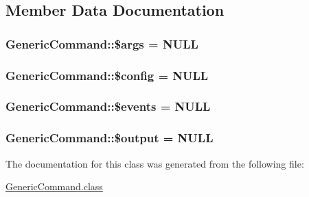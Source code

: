 \subsection{Member Data Documentation}
\hypertarget{classGenericCommand_aaba87ed8dbcb64903cc986bce80905d2}{
\subsubsection[{\$args}]{\setlength{\rightskip}{0pt plus 5cm}Generic\-Command\-::\$args = N\-U\-L\-L\hspace{0.3cm}{\ttfamily [private]}}}\label{classGenericCommand_aaba87ed8dbcb64903cc986bce80905d2}
\hypertarget{classGenericCommand_aa44f85a0df16aec7516d7e2dd97cb5e0}{
\subsubsection[{\$config}]{\setlength{\rightskip}{0pt plus 5cm}Generic\-Command\-::\$config = N\-U\-L\-L\hspace{0.3cm}{\ttfamily [private]}}}\label{classGenericCommand_aa44f85a0df16aec7516d7e2dd97cb5e0}
\hypertarget{classGenericCommand_a88fc89058cfe1af1d211bf82c59deee0}{
\subsubsection[{\$events}]{\setlength{\rightskip}{0pt plus 5cm}Generic\-Command\-::\$events = N\-U\-L\-L\hspace{0.3cm}{\ttfamily [private]}}}\label{classGenericCommand_a88fc89058cfe1af1d211bf82c59deee0}
\hypertarget{classGenericCommand_a8f106d346e007dea8c5bbc421c0a504a}{
\subsubsection[{\$output}]{\setlength{\rightskip}{0pt plus 5cm}Generic\-Command\-::\$output = N\-U\-L\-L\hspace{0.3cm}{\ttfamily [private]}}}\label{classGenericCommand_a8f106d346e007dea8c5bbc421c0a504a}


The documentation for this class was generated from the following file\-:\begin{DoxyCompactItemize}
\item 
\hyperlink{GenericCommand_8class}{Generic\-Command.\-class}\end{DoxyCompactItemize}
